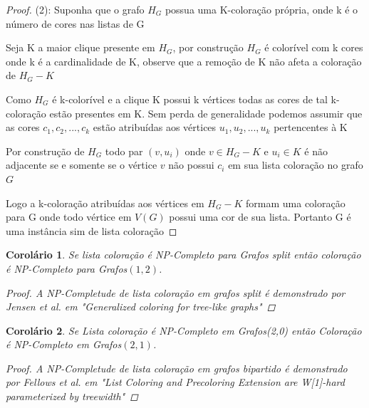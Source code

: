 \documentclass[a4paper,oneside,12pt]{book}
\newtheorem{corolario}{Corolário}
\begin{document}
\begin{proof}
      (2):\newline
      Suponha que o grafo $H_G$ possua uma K-coloração própria, onde k é o número de cores nas listas de G
      
      Seja K a maior clique presente em $H_G$, por construção $H_G$ é colorível com k cores onde k é a cardinalidade de K, observe que a remoção de K não afeta a coloração de $H_G - K$
      
      Como $H_G$ é k-colorível e a clique K possui k vértices todas as cores de tal k-coloração estão presentes em K. Sem perda de generalidade podemos assumir que as cores $c_1,c_2,...,c_k$ estão atribuídas aos vértices $u_1,u_2,...,u_k$ pertencentes à K
      
      Por construção de $H_G$ todo par $(v,u_i)$ onde $v \in H_G - K$ e $u_i \in K$ é não adjacente se e somente se o vértice $v$ não possui $c_i$ em sua lista coloração no grafo $G$
      
      Logo a k-coloração atribuídas aos vértices em $H_G - K$ formam uma coloração para G onde todo vértice em $V(G)$ possui uma cor de sua lista. Portanto G é uma instância sim de lista coloração
    \end{proof}
    \begin{corolario}
     Se lista coloração é NP-Completo para Grafos split então coloração é NP-Completo para Grafos$(1,2)$.
     \begin{proof}
     A NP-Completude de lista coloração em grafos split é demonstrado por Jensen et al. em "Generalized coloring for tree-like graphs"
     \end{proof}
    \end{corolario}
    \begin{corolario}
    Se Lista coloração é NP-Completo em Grafos(2,0) então Coloração é NP-Completo em Grafos$(2,1)$.
    \begin{proof}
    A NP-Completude de lista coloração em grafos bipartido é demonstrado por Fellows et al. em "List Coloring and Precoloring Extension are W[1]-hard parameterized by treewidth"
    \end{proof}
    \end{corolario}    
\end{document}
